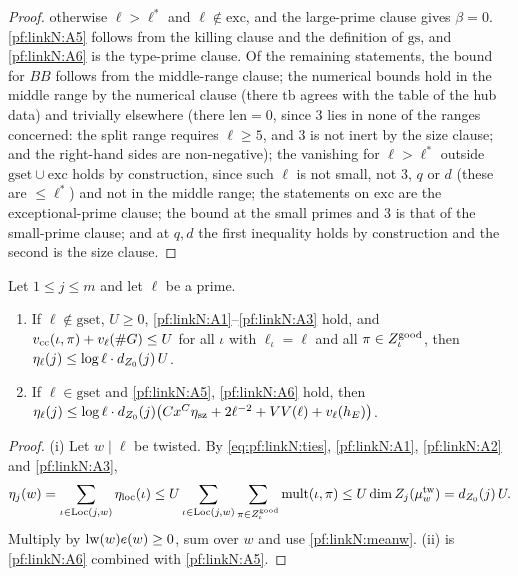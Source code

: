 \begin{proof}
otherwise $\ell>\ell^*$ and $\ell\notin\mathrm{exc}$, and the large-prime clause gives $\beta=0$. \ref{pf:linkN:A5} follows from
the killing clause and the definition of $\mathrm{gs}$, and \ref{pf:linkN:A6} is the type-prime clause. Of the remaining
statements, the bound for $BB$ follows from the middle-range clause; the numerical bounds hold in the middle range by the
numerical clause (there $\mathrm{tb}$ agrees with the table of the hub data) and trivially elsewhere (there $\mathrm{len}=0$,
since $3$ lies in none of the ranges concerned: the split range requires $\ell\ge5$, and $3$ is not inert by the size clause;
and the right-hand sides are non-negative); the vanishing for
$\ell>\ell^*$ outside $\mathrm{gset}\cup\mathrm{exc}$ holds by construction, since such $\ell$ is not small, not $3$, $q$ or
$d$ (these are $\le\ell^*$) and not in the middle range; the statements on $\mathrm{exc}$ are the exceptional-prime clause;
the bound at the small primes and $3$ is that of the small-prime clause; and at $q,d$ the first inequality holds by
construction and the second is the size clause.
\end{proof}

\begin{lemma}\label{pf:linkN:etaAt}
Let $1\le j\le m$ and let $\ell$ be a prime.
\begin{enumerate}[label=(\roman*)]
\item If $\ell\notin\mathrm{gset}$, $U\ge0$, \ref{pf:linkN:A1}--\ref{pf:linkN:A3} hold, and
$v_{\mathrm{cc}}(\iota,\pi)+v_\ell(\#G)\le U$ for all $\iota$ with $\ell_\iota=\ell$ and all $\pi\in Z^{\mathrm{good}}_\iota$, then
$\eta_\ell(j)\le\log\ell\cdot d_{Z_0}(j)\,U$.
\item If $\ell\in\mathrm{gset}$ and \ref{pf:linkN:A5}, \ref{pf:linkN:A6} hold, then
$\eta_\ell(j)\le\log\ell\cdot d_{Z_0}(j)\bigl(Cx^C\eta_{\mathrm{sz}}+2\ell^{-2}+VV(\ell)+v_\ell(h_E)\bigr)$.
\end{enumerate}
\end{lemma}

\begin{proof}
(i) Let $w\mid\ell$ be twisted. By \eqref{eq:pf:linkN:ties}, \ref{pf:linkN:A1}, \ref{pf:linkN:A2} and \ref{pf:linkN:A3},
\[
\eta_j(w)=\sum_{\iota\in\mathrm{Loc}(j,w)}\eta_{\mathrm{loc}}(\iota)\le U\sum_{\iota\in\mathrm{Loc}(j,w)}\sum_{\pi\in Z^{\mathrm{good}}_\iota}
\mathrm{mult}(\iota,\pi)\le U\dim Z_j(\mu^{\mathrm{tw}}_w)=d_{Z_0}(j)\,U .
\]
Multiply by $\mathrm{lw}(w)e(w)\ge0$, sum over $w$ and use \cref{pf:linkN:meanw}. (ii) is \ref{pf:linkN:A6} combined with
\ref{pf:linkN:A5}.
\end{proof}

